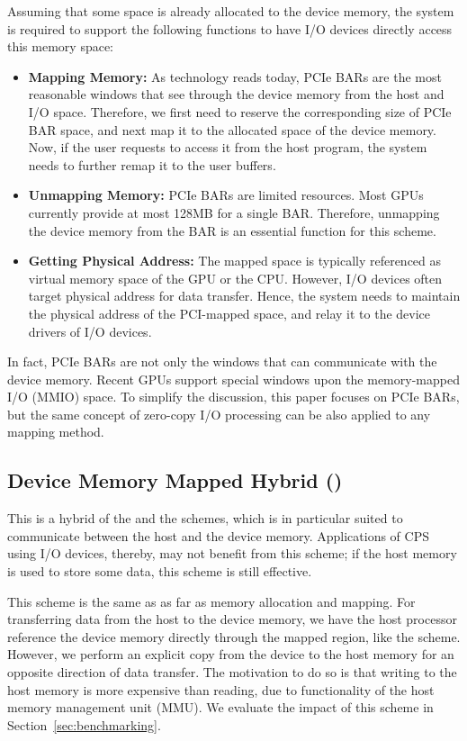 Assuming that some space is already allocated to the device
memory, the system is required to support the following functions to have I/O
devices directly access this memory space:

\begin{itemize} \itemsep1pt
 \item \textbf{Mapping Memory:}
       As technology reads today, PCIe BARs are the most reasonable
       windows that see through the device memory from the host and I/O
       space.
       Therefore, we first need to reserve the corresponding size of
       PCIe BAR space, and next map it to the allocated space of the
       device memory.
       Now, if the user requests to access it from the host program, the
       system needs to further remap it to the user buffers.
 \item \textbf{Unmapping Memory:}
       PCIe BARs are limited resources. Most GPUs currently provide at
       most 128MB for a single BAR.
       Therefore, unmapping the device memory from the BAR is an essential
       function for this scheme.
 \item \textbf{Getting Physical Address:}
       The mapped space is typically referenced as virtual memory space
       of the GPU or the CPU.
       However, I/O devices often target physical address for data transfer.
       Hence, the system needs to maintain the physical address of the
       PCI-mapped space, and relay it to the device drivers of I/O devices.
\end{itemize}

In fact, PCIe BARs are not only the windows that can communicate with
the device memory.
Recent GPUs support special windows upon the memory-mapped I/O (MMIO) space.
To simplify the discussion, this paper focuses on PCIe BARs, but the
same concept of zero-copy I/O processing can be also applied to any
mapping method.

\subsection{Device Memory Mapped Hybrid ({\dmh})}
\label{sec:dmh}

This is a hybrid of the {\dm} and the {\hd} schemes, which is in
particular suited to communicate between the host and the device
memory.
Applications of CPS using I/O devices, thereby, may not benefit from
this scheme; if the host memory is used to store some data, this scheme
is still effective.

This scheme is the same as {\dm} as far as memory allocation
and mapping.
For transferring data from the host to the device memory, we have the
host processor reference the device memory directly through the
mapped region, like the {\dm} scheme.
However, we perform an explicit copy from the device to the host memory
for an opposite direction of data transfer.
The motivation to do so is that writing to the host memory is more
expensive than reading, due to functionality of the host memory
management unit (MMU).
We evaluate the impact of this scheme in Section~\ref{sec:benchmarking}.
